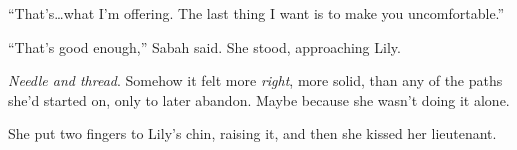 ``That's\ldots what I'm offering.  The last thing I want is to make you uncomfortable.''



``That's good enough,'' Sabah said.  She stood, approaching Lily.



\emph{Needle and thread}.  Somehow it felt more \emph{right}, more solid, than any of the paths she'd started on, only to later abandon.  Maybe because she wasn't doing it alone.



She put two fingers to Lily's chin, raising it, and then she kissed her lieutenant.





